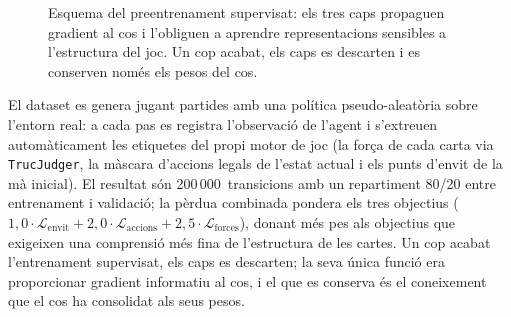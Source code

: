 \begin{figure}[H]
  \centering
  \caption[Esquema del preentrenament supervisat (Fase~3.5).]{Esquema del preentrenament supervisat: els tres caps propaguen gradient al cos
           i l'obliguen a aprendre representacions sensibles a l'estructura del joc.
           Un cop acabat, els caps es descarten i es conserven només els pesos del cos.}
  \label{fig:sl-preentrenament}
\end{figure}

El dataset es genera jugant partides amb una política pseudo-aleatòria sobre l'entorn
real: a cada pas es registra l'observació de l'agent i s'extreuen automàticament les
etiquetes del propi motor de joc (la força de cada carta via \texttt{TrucJudger}, la
màscara d'accions legals de l'estat actual i els punts d'envit de la mà inicial). El
resultat són 200\,000~transicions amb un repartiment 80/20 entre entrenament i validació;
la pèrdua combinada pondera els tres objectius
(\(1{,}0\cdot\mathcal{L}_{\text{envit}} + 2{,}0\cdot\mathcal{L}_{\text{accions}} +
2{,}5\cdot\mathcal{L}_{\text{forces}}\)), donant més pes als objectius que exigeixen una
comprensió més fina de l'estructura de les cartes. Un cop acabat l'entrenament supervisat,
els caps es descarten; la seva única funció era proporcionar gradient informatiu al cos,
i el que es conserva és el coneixement que el cos ha consolidat als seus pesos.

